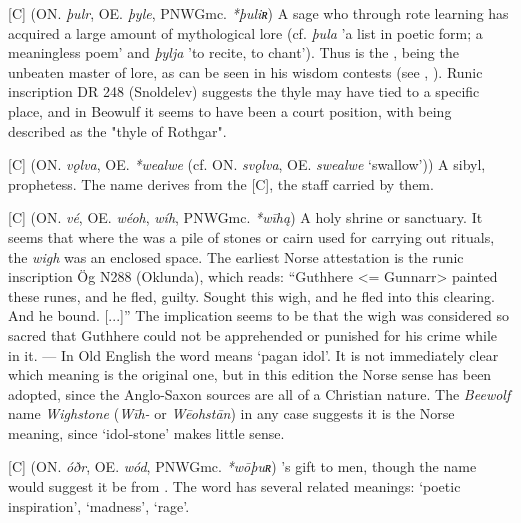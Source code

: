\begin{itemize}
[C] (ON. \emph{þulr}, OE. \emph{þyle}, PNWGmc. \emph{*þuliʀ})
  A sage who through rote learning has acquired a large amount of mythological lore (cf. \emph{þula} 'a list in poetic form; a meaningless poem' and \emph{þylja} 'to recite, to chant'). Thus  is the , being the unbeaten master of lore, as can be seen in his wisdom contests (see \Allvismal, \Vafthrudnismal). Runic inscription DR 248 (Snoldelev) suggests the thyle may have tied to a specific place, and in Beowulf it seems to have been a court position, with  being described as the "thyle of Rothgar".

[C] (ON. \emph{vǫlva}, OE. \emph{*wealwe} (cf. ON. \emph{svǫlva}, OE. \emph{swealwe} ‘swallow’))
  A sibyl, prophetess. The name derives from the [C], the staff carried by them.

[C] (ON. \emph{vé}, OE. \emph{wéoh}, \emph{wíh}, PNWGmc. \emph{*wīhą})
  A holy shrine or sanctuary. It seems that where the  was a pile of stones or cairn used for carrying out rituals, the \emph{wigh} was an enclosed space. The earliest Norse attestation is the runic inscription Ög N288 (Oklunda), which reads: “Guthhere <= Gunnarr> painted these runes, and he fled, guilty. Sought this wigh, and he fled into this clearing. And he bound. [...]” The implication seems to be that the wigh was considered so sacred that Guthhere could not be apprehended or punished for his crime while in it. — In Old English the word means ‘pagan idol’. It is not immediately clear which meaning is the original one, but in this edition the Norse sense has been adopted, since the Anglo-Saxon sources are all of a Christian nature. The \emph{Beewolf} name \emph{Wighstone} (\emph{Wīh-} or \emph{Wēohstān}) in any case suggests it is the Norse meaning, since ‘idol-stone’ makes little sense.

[C] (ON. \emph{óðr}, OE. \emph{wód}, PNWGmc. \emph{*wōþuʀ})
  's gift to men, though the name would suggest it be from . The word has several related meanings: ‘poetic inspiration’, ‘madness’, ‘rage’.

\end{itemize}



